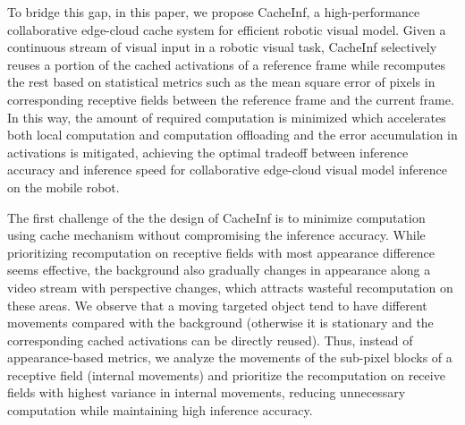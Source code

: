 To bridge this gap, in this paper, we propose CacheInf, a high-performance collaborative edge-cloud cache system for efficient robotic visual model.
Given a continuous stream of visual input in a robotic visual task, CacheInf selectively reuses a portion of the cached activations of a reference frame while recomputes the rest based on statistical metrics such as the mean square error of pixels in corresponding receptive fields between the reference frame and the current frame.
In this way, the amount of required computation is minimized which accelerates both local computation and computation offloading and the error accumulation in activations is mitigated, achieving the optimal tradeoff between inference accuracy and inference speed for collaborative edge-cloud visual model inference on the mobile robot.


The first challenge of the the design of CacheInf is to minimize computation using cache mechanism without compromising the inference accuracy.
While prioritizing recomputation on receptive fields with most appearance difference seems effective, the background also gradually changes in appearance along a video stream with perspective changes, which attracts wasteful recomputation on these areas.
We observe that a moving targeted object tend to have different movements compared with the background (otherwise it is stationary and the corresponding cached activations can be directly reused).
Thus, instead of appearance-based metrics, we analyze the movements of the sub-pixel blocks of a receptive field (internal movements) and prioritize the recomputation on receive fields with highest variance in internal movements, reducing unnecessary computation while maintaining high inference accuracy.

